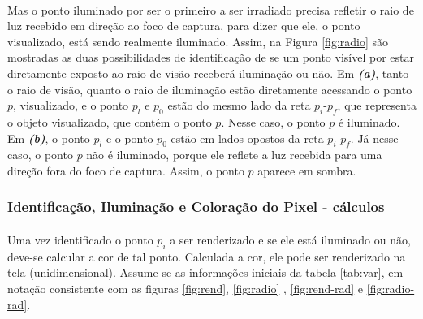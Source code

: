 \documentclass{article}
\begin{document}
	\paragraph{}
	Mas o ponto iluminado por ser o primeiro a ser irradiado precisa refletir o raio de luz recebido em direção ao foco de captura, para dizer que ele, o ponto visualizado, está sendo realmente iluminado. Assim, na Figura \ref{fig:radio} são mostradas as duas possibilidades de identificação de se um ponto visível por estar diretamente exposto ao raio de visão receberá iluminação ou não. Em \textit{\textbf{(a)}}, tanto o raio de visão, quanto o raio de iluminação estão diretamente acessando o ponto $p$, visualizado, e o ponto $p_l$ e $p_0$ estão do mesmo lado da reta $p_i$-$p_f$, que representa o objeto visualizado, que contém o ponto $p$. Nesse caso, o ponto $p$ é iluminado. Em \textit{\textbf{(b)}}, o ponto $p_l$ e o ponto $p_0$ estão em lados opostos da reta $p_i$-$p_f$. Já nesse caso, o ponto $p$ não é iluminado, porque ele reflete a luz recebida para uma direção fora do foco de captura. Assim, o ponto $p$ aparece em sombra.
	
	\subsubsection{Identificação, Iluminação e Coloração do Pixel - cálculos}
	
	\paragraph{}
	Uma vez identificado o ponto $p_i$ a ser renderizado e se ele está iluminado ou não, deve-se calcular a cor de tal ponto. Calculada a cor, ele pode ser renderizado na tela (unidimensional). Assume-se as informações iniciais da tabela \ref{tab:var}, em notação consistente com as figuras \ref{fig:rend}, \ref{fig:radio} , \ref{fig:rend-rad} e \ref{fig:radio-rad}. 
	
\end{document}

